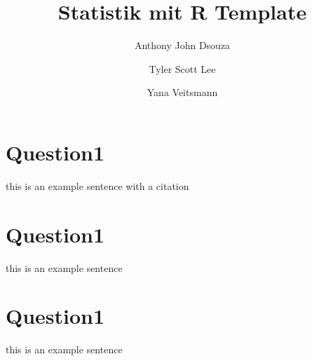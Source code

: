 \documentclass{article}
\title{\vspace {-30mm}\Huge \bfseries \textsc Statistik mit R Template}
\author{Anthony John Dsouza \and Tyler Scott Lee \and Yana Veitsmann}
\date{} %
\begin{document}
	\maketitle
	
	\section{Question1}
	this is an example sentence with a citation \cite{vaswani}
	
	\section{Question1}
	this is an example sentence
	
	\section{Question1}
	this is an example sentence
	
	\printbibliography
	
\end{document}
